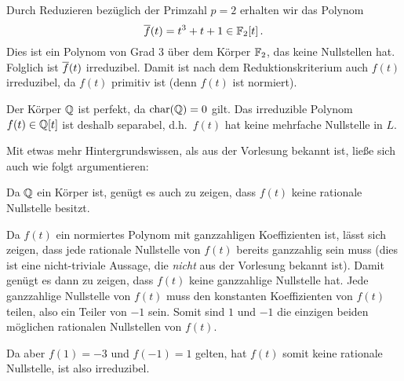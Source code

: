 \section{}





\subsection{}

Durch Reduzieren bezüglich der Primzahl $p = 2$ erhalten wir das Polynom
\[
      \overline{f}(t)
  =   t^3 + t + 1
  \in \mathbb{F}_{2}[t] \,.
\]
Dies ist ein Polynom von Grad $3$ über dem Körper $\mathbb{F}_{2}$, das keine Nullstellen hat.
Folglich ist $\overline{f}(t)$ irreduzibel.
Damit ist nach dem Reduktionskriterium auch $f(t)$ irreduzibel, da $f(t)$ primitiv ist (denn $f(t)$ ist normiert).

Der Körper $\mathbb{Q}$ ist perfekt, da $\operatorname{char}(\mathbb{Q}) = 0$ gilt.
Das irreduzible Polynom $f(t) \in \mathbb{Q}[t]$ ist deshalb separabel, d.h.\ $f(t)$ hat keine mehrfache Nullstelle in $L$.

\begin{remark}
  Mit etwas mehr Hintergrundswissen, als aus der Vorlesung bekannt ist, ließe sich auch wie folgt argumentieren:
  
  Da $\mathbb{Q}$ ein Körper ist, genügt es auch zu zeigen, dass $f(t)$ keine rationale Nullstelle besitzt.
  
  Da $f(t)$ ein normiertes Polynom mit ganzzahligen Koeffizienten ist, lässt sich zeigen, dass jede rationale Nullstelle von $f(t)$ bereits ganzzahlig sein muss (dies ist eine nicht-triviale Aussage, die \emph{nicht} aus der Vorlesung bekannt ist).
  Damit genügt es dann zu zeigen, dass $f(t)$ keine ganzzahlige Nullstelle hat.
  Jede ganzzahlige Nullstelle von $f(t)$ muss den konstanten Koeffizienten von $f(t)$ teilen, also ein Teiler von $-1$ sein.
  Somit sind $1$ und $-1$ die einzigen beiden möglichen rationalen Nullstellen von $f(t)$.
  
  Da aber $f(1) = -3$ und $f(-1) = 1$ gelten, hat $f(t)$ somit keine rationale Nullstelle, ist also irreduzibel.
\end{remark}






\subsection{}

